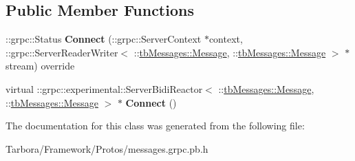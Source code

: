 \subsection*{Public Member Functions}
\begin{DoxyCompactItemize}
\item 
\mbox{\label{classtbMessages_1_1TarboraMessages_1_1ExperimentalWithCallbackMethod__Connect_a0df1a2785b45e3ce8f86341203d1dae8}} 
\+::grpc\+::\+Status {\bfseries Connect} (\+::grpc\+::\+Server\+Context $\ast$context, \+::grpc\+::\+Server\+Reader\+Writer$<$ \+::\hyperlink{classtbMessages_1_1Message}{tb\+Messages\+::\+Message}, \+::\hyperlink{classtbMessages_1_1Message}{tb\+Messages\+::\+Message} $>$ $\ast$stream) override
\item 
\mbox{\label{classtbMessages_1_1TarboraMessages_1_1ExperimentalWithCallbackMethod__Connect_a5e887f897381c082962770541db3d397}} 
virtual \+::grpc\+::experimental\+::\+Server\+Bidi\+Reactor$<$ \+::\hyperlink{classtbMessages_1_1Message}{tb\+Messages\+::\+Message}, \+::\hyperlink{classtbMessages_1_1Message}{tb\+Messages\+::\+Message} $>$ $\ast$ {\bfseries Connect} ()
\end{DoxyCompactItemize}


The documentation for this class was generated from the following file\+:\begin{DoxyCompactItemize}
\item 
Tarbora/\+Framework/\+Protos/messages.\+grpc.\+pb.\+h\end{DoxyCompactItemize}

